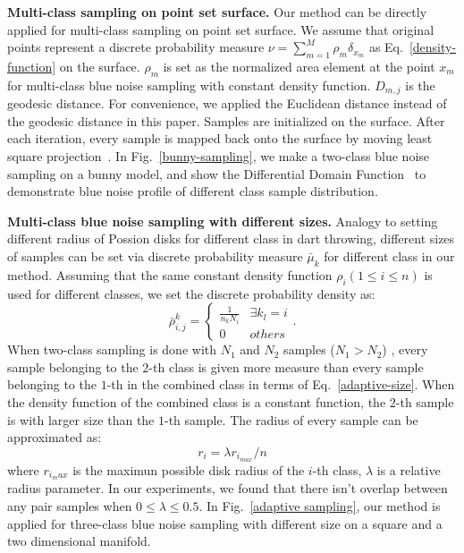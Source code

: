 \textbf{Multi-class sampling on point set surface.}
Our method can be directly applied for multi-class sampling on point set surface.
We assume that original points represent a discrete probability measure $\nu=\sum\limits_{m=1}^{M}\rho_m\delta_{x_m}$ as Eq.~\ref{density-function} on the surface.
$\rho_m$ is set as the normalized area element at the point $x_m$ for multi-class blue noise sampling with constant density function.
$D_{m,j}$ is the geodesic distance.
For convenience,
we applied the Euclidean distance instead of the geodesic distance in this paper.
Samples are initialized on the surface.
After each iteration,
every sample is mapped back onto the surface by
moving least square projection~\cite{alexa:2001:point}.
In Fig.~\ref{bunny-sampling},
we make a two-class blue noise sampling on a bunny model,
and show the Differential Domain Function~\cite{wei:2011:differential} to demonstrate blue noise profile of different class sample distribution.

\textbf{Multi-class blue noise sampling with different sizes.}
Analogy to setting different radius of Possion disks for different class in dart throwing,
different sizes of samples can be set  via discrete probability measure $\bar\mu_k$ for different class in our method.
Assuming that the same constant density function $\rho_i (1\leq i\leq n)$ is used for different classes,
we set the discrete probability density as:
\begin{equation}\label{adaptive-size}
  \bar\rho_{i,j}^k= \left\{
  \begin{array} {cl}
  \frac{1}{n_kN_i} & \exists k_l = i \\
  0 & others
  \end{array} \right..
\end{equation}
When two-class sampling is done with $N_1$ and $N_2$ samples ($N_1>N_2$) ,
every sample belonging to the $2$-th class is given more measure than every sample belonging to the $1$-th in the combined class in terms of Eq.~\ref{adaptive-size}.
When the density function of the combined class is a constant function,
the $2$-th sample is with larger size than the $1$-th sample.
The radius of every sample can be approximated as:
\begin{equation*}
  r_i=\lambda r_{i_{max}}/n
\end{equation*}
where $r_{i_max}$ is the maximun possible disk radius of the $i$-th class,
$\lambda$ is a relative radius parameter.
In our experiments,
we found that there isn't overlap between any pair samples when $0\leq\lambda\leq 0.5$.
In Fig.~\ref{adaptive sampling},
our method is applied for three-class blue noise sampling with different size on a square and a two dimensional manifold.


